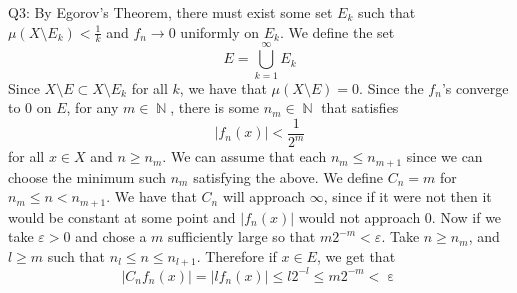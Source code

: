\documentclass[letterpaper]{article}
\DeclareMathOperator{\N}{\mathbb{N}}
\DeclareMathOperator{\ep}{\varepsilon}
\begin{document}
\noindent
Q3: By Egorov's Theorem, there must exist some set $E_k$ such that $\mu(X \setminus E_k)< \frac{1}{k}$ and $f_n \to 0$ uniformly on $E_k$. 
We define the set $$E = \bigcup_{k=1}^\infty E_k$$
Since $X \setminus E \subset X\setminus E_k$ for all $k$, we have that $\mu(X \setminus E) =0$. Since the $f_n$'s converge to 0 on $E$, for any $m\in \N$, there is some $n_m \in \N$ that satisfies $$|f_n(x)|<\frac{1}{2^m}$$ for all $x\in X$ and $n\geq n_m$. We can assume that each $n_m \leq n_{m+1}$ since we can choose the minimum such $n_m$ satisfying the above. We define $C_n = m$ for $n_m \leq n < n_{m+1}$. We have that $C_n$ will approach $\infty$, since if it were not then it would be constant at some point and $|f_n(x)|$ would not approach 0. Now if we take $\varepsilon>0$ and chose a $m$ sufficiently large so that $m2^{-m}< \varepsilon$. Take $n \geq n_m$, and $l\geq m$ such that $n_{l} \leq n \leq n_{l+1}$. Therefore if $x\in E$, we get that $$|C_nf_n(x)| = |lf_n(x)| \leq l 2^{-l}\leq m2^{-m} < \ep$$
\end{document}
